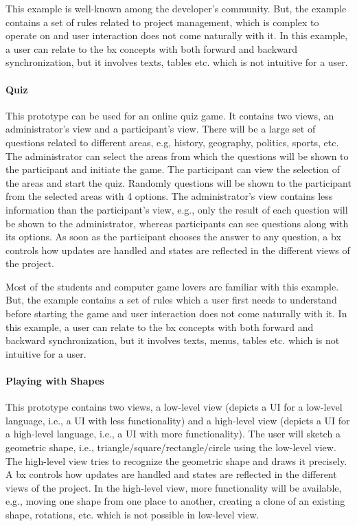 This example is well-known among the developer's community. But, the example contains a set of rules related to project management, which is complex to operate on and user interaction does not come naturally with it. In this example, a user can relate to the bx concepts with both forward and backward synchronization, but it involves texts, tables etc. which is not intuitive for a user.

\paragraph{Quiz} This prototype can be used for an online quiz game. It contains two views, an administrator's view and a participant's view.
There will be a large set of questions related to different areas, e.g, history, geography, politics, sports, etc. The administrator can select the areas from which the questions will be shown to the participant and initiate the game. The participant can view the selection of the areas and start the quiz. Randomly questions will be shown to the participant from the selected areas with 4 options. The administrator's view contains less information than the participant's view, e.g., only the result of each question will be shown to the administrator, whereas participants can see questions along with its options. As soon as the participant chooses the answer to any question, a bx controls how updates are handled and states are reflected in the different views of the project.

Most of the students and computer game lovers are familiar with this example. But, the example contains a set of rules which a user first needs to understand before starting the game and user interaction does not come naturally with it. In this example, a user can relate to the bx concepts with both forward and backward synchronization, but it involves texts, menus, tables etc. which is not intuitive for a user.

\paragraph{Playing with Shapes} This prototype contains two views, a low-level view (depicts a \ac{UI} for a low-level language, i.e., a UI with less functionality) and a high-level view (depicts a UI for a high-level language, i.e., a UI with more functionality). The user will sketch a geometric shape, i.e., triangle/square/rectangle/circle using the low-level view. The high-level view tries to recognize the geometric shape and draws it precisely. A bx controls how updates are handled and states are reflected in the different views of the project. In the high-level view, more functionality will be available, e.g., moving one shape from one place to another, creating a clone of an existing shape, rotations, etc. which is not possible in low-level view.

